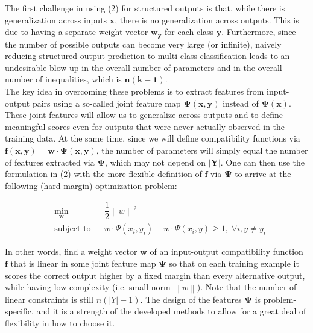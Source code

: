 \documentclass[twoside]{article}
\newcommand{\norm}[1]{\left\lVert #1 \right\rVert}
\begin{document}
The first challenge in using (2) for structured outputs is that, while there is generalization across inputs $\mathbf{x}$, there is no generalization across outputs. This is due to having a
separate weight vector $\mathbf{w_y}$ for each class $\mathbf{y}$. Furthermore,
since the number of possible outputs can become very large (or infinite), naively reducing structured output prediction
to multi-class classification leads to an undesirable blow-up
in the overall number of parameters and in the overall number of inequalities, which is $\mathbf{n(k-1)}$. \\

The key idea in overcoming these problems is to extract
features from input-output pairs using a so-called joint feature map $\mathbf{\Psi(x, y)}$ instead of $\mathbf{\Psi(x)}$. These joint features will allow us to generalize across outputs and to define meaningful scores even
for outputs that were never actually observed in the training data. At the same time, since we will define compatibility
functions via $\mathbf{f(x, y) = w\cdot \Psi(x, y)}$, the number of parameters will simply equal the number of features extracted via
$\mathbf{\Psi}$, which may not depend on $\mathbf{|Y|}$. One can then use the formulation in (2) with the more flexible definition of $\mathbf{f}$ via $\mathbf{\Psi}$ to
arrive at the following (hard-margin) optimization problem:

\begin{equation*}
\begin{aligned}
& \underset{\textbf{w}}{\text{min}}
& & \dfrac{1}{2} \norm{w}^2  \\
& \text{subject to}
& & w \cdot \Psi(x_{i},y_{i}) - w \cdot \Psi(x_{i},y) \geq 1 , \;\forall i, y \not = y_{i}
\end{aligned}
\end{equation*}

In other words, find a weight vector $\mathbf{w}$ of an input-output compatibility function $\mathbf{f}$ that is linear in some joint feature map $\mathbf{\Psi}$
so that on each training example it scores the correct output
higher by a fixed margin than every alternative output, while
having low complexity (i.e. small norm $\norm{w}$). Note that the
number of linear constraints is still $n(|Y| -1)$. The design of the features $\mathbf{\Psi}$ is problem-specific, and it is a
strength of the developed methods to allow for a great deal of flexibility in how to choose it.
\end{document}
